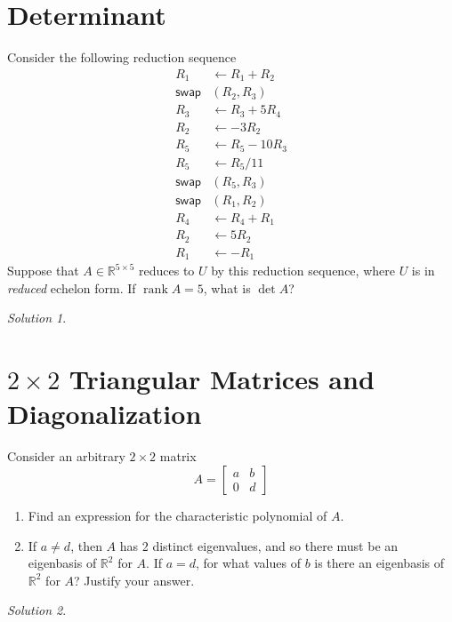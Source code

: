 \documentclass{article}
\newcommand{\R}{\mathbb R}
\DeclareMathOperator{\rank}{rank}
\theoremstyle{remark}
\newtheorem*{solution}{Solution}
\begin{document}
\section{Determinant}
Consider the following reduction sequence
\begin{align*}
  R_1 &\gets R_1 + R_2 \\
  \mathsf{swap}&(R_2, R_3) \\
  R_3 &\gets R_3 + 5R_4 \\
  R_2 &\gets -3R_2 \\
  R_5 &\gets R_5 - 10R_3 \\
  R_5 &\gets R_5 / 11 \\
  \mathsf{swap}&(R_5, R_3) \\
  \mathsf{swap}&(R_1, R_2) \\
  R_4 &\gets R_4 + R_1 \\
  R_2 &\gets 5R_2 \\
  R_1 &\gets -R_1
\end{align*}
Suppose that $A \in \R^{5 \times 5}$ reduces to $U$ by this reduction sequence, where $U$ is in \textit{reduced} echelon form.
If $\rank A = 5$, what is $\det A$?
\medskip

\begin{solution}
\end{solution}


\pagebreak
\section{$2 \times 2$ Triangular Matrices and Diagonalization}

Consider an arbitrary $2 \times 2$ matrix
\begin{displaymath}
  A =
  \begin{bmatrix}
    a & b \\
    0 & d
  \end{bmatrix}
\end{displaymath}

\begin{enumerate}
\item
  Find an expression for the characteristic polynomial of $A$.
\item
  If $a \not = d$, then $A$ has 2 distinct eigenvalues, and so there must be an eigenbasis of $\R^2$ for $A$.
  If $a = d$, for what values of $b$ is there an eigenbasis of $\R^2$ for $A$?
  Justify your answer.
\end{enumerate}
\medskip

\begin{solution}
\end{solution}
\end{document}

